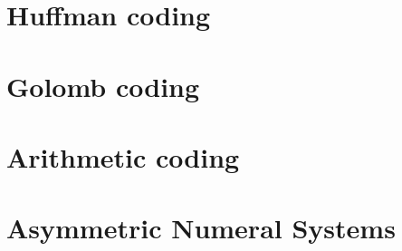 \section{Huffman coding}

\section{Golomb coding}

\section{Arithmetic coding}

\section{Asymmetric Numeral Systems}

